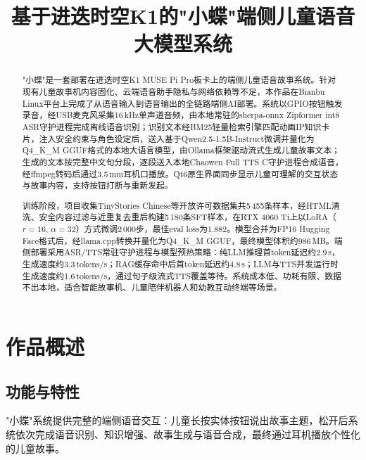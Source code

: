 \documentclass[lettersize,journal]{IEEEtran}
\begin{document}
\title{基于进迭时空K1的"小蝶"端侧儿童语音大模型系统}
\author{}
\maketitle

\begin{abstract}
"小蝶"是一套部署在进迭时空K1 MUSE Pi Pro板卡上的端侧儿童语音故事系统。针对现有儿童故事机内容固化、云端语音助手隐私与网络依赖等不足，本作品在Bianbu Linux平台上完成了从语音输入到语音输出的全链路端侧AI部署。系统以GPIO按钮触发录音，经USB麦克风采集16\,kHz单声道音频，由本地常驻的sherpa-onnx Zipformer int8 ASR守护进程完成离线语音识别；识别文本经BM25轻量检索引擎匹配动画IP知识卡片，注入安全约束与角色设定后，送入基于Qwen2.5-1.5B-Instruct微调并量化为Q4\_K\_M GGUF格式的本地大语言模型，由Ollama框架驱动流式生成儿童故事文本；生成的文本按完整中文句分段，逐段送入本地Chaowen Full TTS C守护进程合成语音，经ffmpeg转码后通过3.5\,mm耳机口播放。Qt6原生界面同步显示儿童可理解的交互状态与故事内容，支持按钮打断与重新发起。

训练阶段，项目收集TinyStories Chinese等开放许可数据集共5\,455条样本，经HTML清洗、安全内容过滤与近重复去重后构建5\,180条SFT样本，在RTX 4060 Ti上以LoRA（$r=16$, $\alpha=32$）方式微调2\,000步，最佳eval loss为1.882。模型合并为FP16 Hugging Face格式后，经llama.cpp转换并量化为Q4\_K\_M GGUF，最终模型体积约986\,MB。端侧部署采用ASR/TTS常驻守护进程与模型预热策略：纯LLM推理首token延迟约2.9\,s，生成速度约3.3\,tokens/s；RAG缓存命中后首token延迟约4.8\,s；LLM与TTS并发运行时生成速度约1.6\,tokens/s，通过句子级流式TTS覆盖等待。系统成本低、功耗有限、数据不出本地，适合智能故事机、儿童陪伴机器人和幼教互动终端等场景。
\end{abstract}

\IEEEpeerreviewmaketitle

\section{作品概述}
\label{sec:overview}

\subsection{功能与特性}

"小蝶"系统提供完整的端侧语音交互：儿童长按实体按钮说出故事主题，松开后系统依次完成语音识别、知识增强、故事生成与语音合成，最终通过耳机播放个性化的儿童故事。
\end{document}
